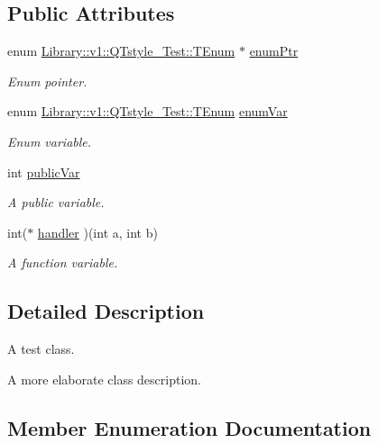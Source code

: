 \subsection*{Public Attributes}
\begin{DoxyCompactItemize}
\item 
enum \mbox{\hyperlink{class_library_1_1v1_1_1_q_tstyle___test_ac4bc26cc9920a5addfcea6c9f88e10bf}{Library\+::v1\+::\+Q\+Tstyle\+\_\+\+Test\+::\+T\+Enum}} $\ast$ \mbox{\hyperlink{class_library_1_1v1_1_1_q_tstyle___test_a84eea9c54a172dd84152d7435837d040}{enum\+Ptr}}
\begin{DoxyCompactList}\small\item\em Enum pointer. \end{DoxyCompactList}\item 
enum \mbox{\hyperlink{class_library_1_1v1_1_1_q_tstyle___test_ac4bc26cc9920a5addfcea6c9f88e10bf}{Library\+::v1\+::\+Q\+Tstyle\+\_\+\+Test\+::\+T\+Enum}} \mbox{\hyperlink{class_library_1_1v1_1_1_q_tstyle___test_a4d6b8e15ccca6defc857c9422d51248f}{enum\+Var}}
\begin{DoxyCompactList}\small\item\em Enum variable. \end{DoxyCompactList}\item 
int \mbox{\hyperlink{class_library_1_1v1_1_1_q_tstyle___test_aeaa1f30fff77bfdd45cda39f6b059fc0}{public\+Var}}
\begin{DoxyCompactList}\small\item\em A public variable. \end{DoxyCompactList}\item 
int($\ast$ \mbox{\hyperlink{class_library_1_1v1_1_1_q_tstyle___test_abf53a8cc936f2592a3110953432076a6}{handler}} )(int a, int b)
\begin{DoxyCompactList}\small\item\em A function variable. \end{DoxyCompactList}\end{DoxyCompactItemize}


\subsection{Detailed Description}
A test class. 

A more elaborate class description. 

\subsection{Member Enumeration Documentation}
\mbox{\label{class_library_1_1v1_1_1_q_tstyle___test_ac4bc26cc9920a5addfcea6c9f88e10bf}} 
